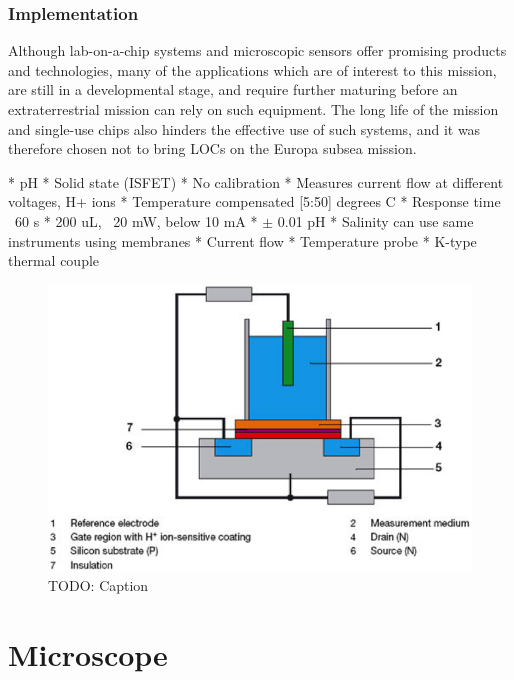 \subsubsection{Implementation}
Although lab-on-a-chip systems and microscopic sensors offer promising products and technologies, many of the applications which are of interest to this mission, are still in a developmental stage, and require further maturing before an extraterrestrial mission can rely on such equipment. The long life of the mission and single-use chips also hinders the effective use of such systems, and it was therefore chosen not to bring LOCs on the Europa subsea mission.


* pH
	* Solid state (ISFET)
		* No calibration
		* Measures current flow at different voltages, H+ ions
	* Temperature compensated [5:50] degrees C
		* Response time ~60 s
	* 200 uL, ~20 mW, below 10 mA
	* $\pm$ 0.01 pH
* Salinity can use same instruments using membranes
	* Current flow
* Temperature probe
	* K-type thermal couple

\begin{figure}[htb]
	\centering
	\includegraphics[width=\textwidth]{figures/ISFET.png}
	\caption{TODO: Caption}
	\label{fig:ISFET}
\end{figure}



\section{Microscope}
